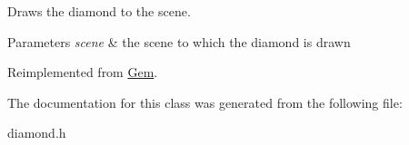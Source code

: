 Draws the diamond to the scene. 


\begin{DoxyParams}{Parameters}
{\em scene} & the scene to which the diamond is drawn \\
\hline
\end{DoxyParams}


Reimplemented from \hyperlink{classGem_a7b8029d12d3bfd6d2c897f5c0f930c38}{Gem}.



The documentation for this class was generated from the following file\-:\begin{DoxyCompactItemize}
\item 
diamond.\-h\end{DoxyCompactItemize}
